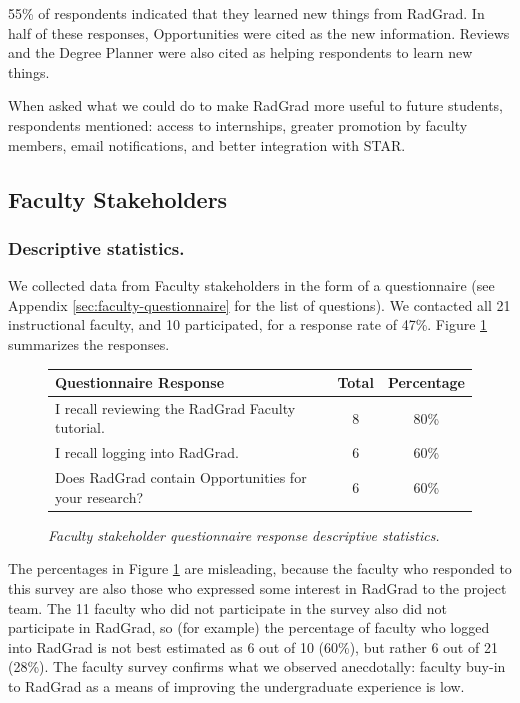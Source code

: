 \documentclass[acmsmall,nonacm]{acmart}
\begin{document}
55\% of respondents indicated that they learned new things from RadGrad. In half of these responses, Opportunities were cited as the new information. Reviews and the Degree Planner were also cited as helping respondents to learn new things.

When asked what we could do to make RadGrad more useful to future students, respondents mentioned: access to internships, greater promotion by faculty members, email notifications, and better integration with STAR.

\subsection{Faculty Stakeholders}

\subsubsection{Descriptive statistics.} We collected data from Faculty stakeholders in the form of a questionnaire (see Appendix \ref{sec:faculty-questionnaire} for the list of questions). We contacted all 21 instructional faculty, and 10 participated, for a response rate of 47\%.  Figure \ref{fig:faculty-questionnaire-responses} summarizes the responses.

\begin{figure}[th]
\centering
\small
\begin{tabular}{ p{4in} c c }
\hline
 Questionnaire Response &  Total & Percentage   \\
\hline
I recall reviewing the RadGrad Faculty tutorial. & 8 & 80\% \\
I recall logging into RadGrad.                   & 6 & 60\% \\
Does RadGrad contain Opportunities for your research?  & 6 & 60\% \\
\hline
\end{tabular}
\caption{\em Faculty stakeholder questionnaire response descriptive statistics.}
\normalsize
\label{fig:faculty-questionnaire-responses}
\end{figure}

The percentages in Figure \ref{fig:faculty-questionnaire-responses} are misleading, because the faculty who responded to this survey are also those who expressed some interest in RadGrad to the project team. The 11 faculty who did not participate in the survey also did not participate in RadGrad, so (for example) the percentage of faculty who logged into RadGrad is not best estimated as 6 out of 10 (60\%), but rather 6 out of 21 (28\%).  The faculty survey confirms what we observed anecdotally: faculty buy-in to RadGrad as a means of improving the undergraduate experience is low.
\end{document}
